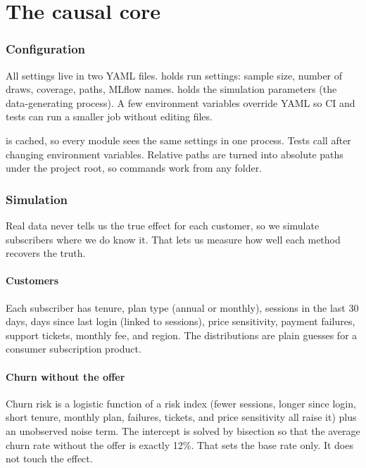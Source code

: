 \documentclass[11pt]{article}
\begin{document}
\part{The causal core}

\section{Configuration}
\label{sec:config}
All settings live in two YAML files.  holds run settings: sample size, number of draws, coverage, paths, MLflow names.  holds the simulation parameters (the data-generating process). A few environment variables override YAML so CI and tests can run a smaller job without editing files.


 is cached, so every module sees the same settings in one process. Tests call  after changing environment variables. Relative paths are turned into absolute paths under the project root, so commands work from any folder.

\section{Simulation}
\label{sec:simulate}
Real data never tells us the true effect for each customer, so we simulate subscribers where we do know it. That lets us measure how well each method recovers the truth.

\subsection{Customers}
Each subscriber has tenure, plan type (annual or monthly), sessions in the last 30 days, days since last login (linked to sessions), price sensitivity, payment failures, support tickets, monthly fee, and region. The distributions are plain guesses for a consumer subscription product.

\subsection{Churn without the offer}
Churn risk is a logistic function of a risk index (fewer sessions, longer since login, short tenure, monthly plan, failures, tickets, and price sensitivity all raise it) plus an unobserved noise term. The intercept is solved by bisection so that the average churn rate without the offer is exactly 12\%. That sets the base rate only. It does not touch the effect.
\end{document}

